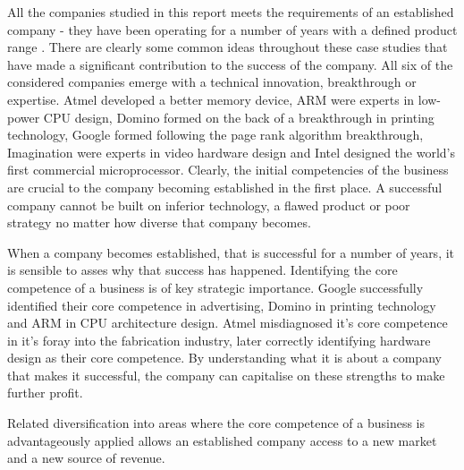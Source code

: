 
All the companies studied in this report meets the requirements of an established company - they have been operating for a number of years with a defined product range \cite{kekale2007successful}.
There are clearly some common ideas throughout these case studies that have made a significant contribution to the success of the company.
All six of the considered companies emerge with a technical innovation, breakthrough or expertise.
Atmel developed a better memory device, ARM were experts in low-power CPU design, Domino formed on the back of a breakthrough in printing technology, Google formed following the page rank algorithm breakthrough, Imagination were experts in video hardware design and Intel designed the world's first commercial microprocessor.
Clearly, the initial competencies of the business are crucial to the company becoming established in the first place.
A successful company cannot be built on inferior technology, a flawed product or poor strategy no matter how diverse that company becomes.

When a company becomes established, that is successful for a number of years, it is sensible to asses why that success has happened.
Identifying the core competence of a business is of key strategic importance. 
Google successfully identified their core competence in advertising, Domino in printing technology and ARM in CPU architecture design. 
Atmel misdiagnosed it's core competence in it's foray into the fabrication industry, later correctly identifying hardware design as their core competence.
By understanding what it is about a company that makes it successful, the company can capitalise on these strengths to make further profit.

Related diversification into areas where the core competence of a business is advantageously applied allows an established company access to a new market and a new source of revenue.


